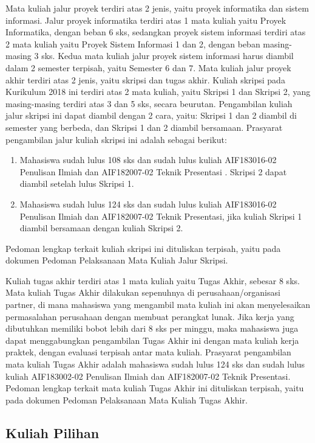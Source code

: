 Mata kuliah jalur proyek  terdiri atas 2 jenis, yaitu proyek informatika dan sistem informasi. Jalur proyek informatika terdiri atas 1 mata kuliah yaitu Proyek Informatika, dengan beban 6 sks, sedangkan proyek sistem informasi terdiri atas 2 mata kuliah yaitu Proyek Sistem Informasi 1 dan 2, dengan beban masing-masing 3 sks. Kedua mata kuliah jalur proyek sistem informasi harus diambil dalam 2 semester terpisah, yaitu Semester 6 dan 7. 
Mata kuliah jalur proyek akhir terdiri atas 2 jenis, yaitu skripsi dan tugas akhir. Kuliah skripsi pada Kurikulum 2018 ini terdiri atas 2 mata kuliah, yaitu Skripsi 1 dan Skripsi 2, yang masing-masing terdiri atas 3 dan 5 sks, secara beurutan. Pengambilan kuliah jalur skripsi ini dapat diambil dengan 2 cara, yaitu: Skripsi 1 dan 2 diambil di semester yang berbeda, dan Skripsi 1 dan 2 diambil bersamaan. Prasyarat pengambilan jalur kuliah skripsi ini adalah sebagai berikut: 
\begin{enumerate}
	\item	Mahasiswa sudah lulus 108 sks dan sudah lulus kuliah AIF183016-02 Penulisan Ilmiah dan AIF182007-02 Teknik Presentasi . Skripsi 2 dapat diambil setelah lulus Skripsi 1.
	\item Mahasiswa sudah lulus 124 sks dan sudah lulus kuliah AIF183016-02 Penulisan Ilmiah dan AIF182007-02 Teknik Presentasi, jika kuliah Skripsi 1 diambil bersamaan dengan kuliah Skripsi 2.
\end{enumerate}
Pedoman lengkap terkait kuliah skripsi ini dituliskan terpisah, yaitu pada dokumen Pedoman Pelaksanaan Mata Kuliah Jalur Skripsi.

Kuliah tugas akhir terdiri atas 1 mata kuliah yaitu Tugas Akhir, sebesar 8 sks. Mata kuliah Tugas Akhir dilakukan sepenuhnya di perusahaan/organisasi partner, di mana mahasiswa yang mengambil mata kuliah ini akan menyelesaikan permasalahan perusahaan dengan membuat perangkat lunak. Jika kerja yang dibutuhkan memiliki bobot lebih dari 8 sks per minggu, maka mahasiswa juga dapat menggabungkan pengambilan Tugas Akhir ini dengan mata kuliah kerja praktek, dengan evaluasi terpisah antar mata kuliah.
Prasyarat pengambilan mata kuliah Tugas Akhir adalah mahasiswa sudah lulus 124 sks dan sudah lulus kuliah AIF183002-02 Penulisan Ilmiah dan AIF182007-02 Teknik Presentasi.
Pedoman lengkap terkait mata kuliah Tugas Akhir ini dituliskan terpisah, yaitu pada dokumen Pedoman Pelaksanaan Mata Kuliah Tugas Akhir.

\subsection{Kuliah Pilihan}

